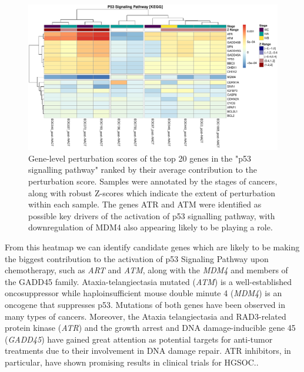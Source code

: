 \documentclass[9pt,a4paper,]{extarticle}
\begin{document}
\begin{figure}

{\centering \includegraphics[width=1\linewidth]{sSNAPPY_paper_files/figure-latex/Figure6-1} 

}

\caption{Gene-level perturbation scores of the top 20 genes in the "p53 signalling pathway" ranked by their average contribution to the perturbation score. Samples were annotated by the stages of cancers, along with robust Z-scores which indicate the extent of perturbation within each sample. The genes ATR and ATM were identified as possible key drivers of the activation of p53 signalling pathway, with downregulation of MDM4 also appearing likely to be playing a role.}\label{fig:Figure6}
\end{figure}

From this heatmap we can identify candidate genes which are likely to be making the biggest contribution to the activation of p53 Signaling Pathway upon chemotherapy, such as \emph{ART} and \emph{ATM}, along with the \emph{MDM4} and members of the GADD45 family.
Ataxia-telangiectasia mutated (\emph{ATM}) is a well-established oncosuppressor\citep{Moslemi2021} while haploinsufficient mouse double minute 4 (\emph{MDM4}) is an oncogene that suppresses p53\citep{Momand}. Mutations of both genes have been observed in many types of cancers\citep{Choi2016, Gansmo2016, Atwal2009}.
Moreover, the Ataxia telangiectasia and RAD3-related protein kinase (\emph{ATR}) and the growth arrest and DNA damage-inducible gene 45 (\emph{GADD45}) have gained great attention as potential targets for anti-tumor treatments due to their involvement in DNA damage repair\citep{Liebermann2011, Hu2022}.
ATR inhibitors, in particular, have shown promising results in clinical trials for HGSOC.\citep{Li2022, Gong2021}.
\end{document}
